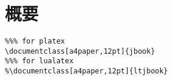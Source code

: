 \chapter*{概要}

\begin{verbatim}
%%% for platex
\documentclass[a4paper,12pt]{jbook}
%%% for lualatex
%\documentclass[a4paper,12pt]{ltjbook}
\end{verbatim}


